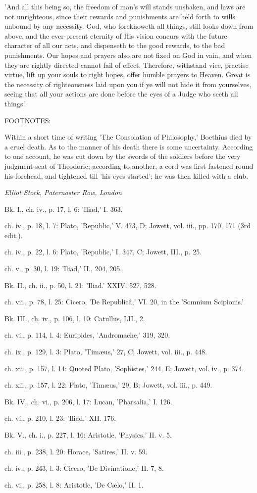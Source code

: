 'And all this being so, the freedom of man's will stands unshaken, and
laws are not unrighteous, since their rewards and punishments are held
forth to wills unbound by any necessity. God, who foreknoweth all
things, still looks down from above, and the ever-present eternity of
His vision concurs with the future character of all our acts, and
dispenseth to the good rewards, to the bad punishments. Our hopes and
prayers also are not fixed on God in vain, and when they are rightly
directed cannot fail of effect. Therefore, withstand vice, practise
virtue, lift up your souls to right hopes, offer humble prayers to
Heaven. Great is the necessity of righteousness laid upon you if ye will
not hide it from yourselves, seeing that all your actions are done
before the eyes of a Judge who seeth all things.'

FOOTNOTES:


Within a short time of writing 'The Consolation of Philosophy,' Boethius
died by a cruel death. As to the manner of his death there is some
uncertainty. According to one account, he was cut down by the swords of
the soldiers before the very judgment-seat of Theodoric; according to
another, a cord was first fastened round his forehead, and tightened
till 'his eyes started'; he was then killed with a club.

\emph{Elliot Stock, Paternoster Row, London}


Bk. I., ch. iv., p. 17, l. 6: 'Iliad,' I. 363.

ch. iv., p. 18, l. 7: Plato, 'Republic,' V. 473, D; Jowett, vol. iii., pp. 170, 171 (3rd edit.).

ch. iv., p. 22, l. 6: Plato, 'Republic,' I. 347, C; Jowett, III., p. 25.

ch. v., p. 30, l. 19: 'Iliad,' II., 204, 205.

Bk. II., ch. ii., p. 50, l. 21: 'Iliad.' XXIV. 527, 528.

ch. vii., p. 78, l. 25: Cicero, 'De Republicâ,' VI. 20, in the 'Somnium Scipionis.'

Bk. III., ch. iv., p. 106, l. 10: Catullus, LII., 2.

ch. vi., p. 114, l. 4: Euripides, 'Andromache,' 319, 320.

ch. ix., p. 129, l. 3: Plato, 'Timæus,' 27, C; Jowett, vol. iii., p. 448.

ch. xii., p. 157, l. 14: Quoted Plato, 'Sophistes,' 244, E; Jowett, vol. iv., p. 374.

ch. xii., p. 157, l. 22: Plato, 'Timæus,' 29, B; Jowett, vol. iii., p. 449.

Bk. IV., ch. vi., p. 206, l. 17: Lucan, 'Pharsalia,' I. 126.

ch. vi., p. 210, l. 23: 'Iliad,' XII. 176.

Bk. V., ch. i., p. 227, l. 16: Aristotle, 'Physics,' II. v. 5.

ch. iii., p. 238, l. 20: Horace, 'Satires,' II. v. 59.

ch. iv., p. 243, l. 3: Cicero, 'De Divinatione,' II. 7, 8.

ch. vi., p. 258, l. 8: Aristotle, 'De Cælo,' II. 1.
